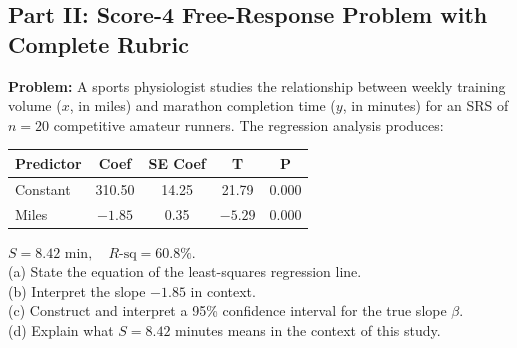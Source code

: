 \subsection*{Part II: Score-4 Free-Response Problem with Complete Rubric}

\begin{frqrubricbox}
\textbf{Problem:} A sports physiologist studies the relationship between weekly training volume ($x$, in miles) and marathon completion time ($y$, in minutes) for an SRS of $n = 20$ competitive amateur runners. The regression analysis produces:
\begin{center}
\begin{tabular}{lcccc}
\toprule
\textbf{Predictor} & \textbf{Coef} & \textbf{SE Coef} & \textbf{T} & \textbf{P} \\
\midrule
Constant & 310.50 & 14.25 & 21.79 & 0.000 \\
Miles & $-1.85$ & 0.35 & $-5.29$ & 0.000 \\
\bottomrule
\end{tabular}
\end{center}
$S = 8.42\text{ min}, \quad R\text{-sq} = 60.8\%$.\\
(a) State the equation of the least-squares regression line.\\
(b) Interpret the slope $-1.85$ in context.\\
(c) Construct and interpret a 95\% confidence interval for the true slope $\beta$.\\
(d) Explain what $S = 8.42$ minutes means in the context of this study.


\end{frqrubricbox}
